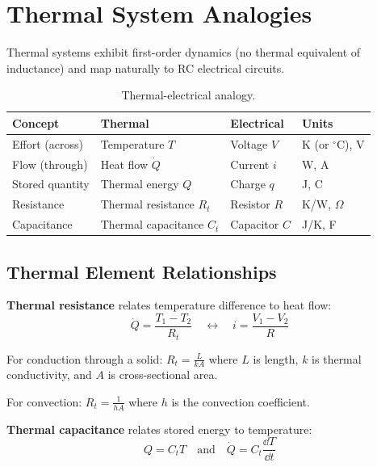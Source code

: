\section{Thermal System Analogies}
\label{sec:thermal}

Thermal systems exhibit first-order dynamics (no thermal equivalent of inductance) and map naturally to RC electrical circuits.

\begin{table}[htbp]
\centering
\begin{tabular}{llll}
\toprule
\textbf{Concept} & \textbf{Thermal} & \textbf{Electrical} & \textbf{Units} \\
\midrule
Effort (across) & Temperature $T$ & Voltage $V$ & K (or $^\circ$C), V \\
Flow (through) & Heat flow $\dot{Q}$ & Current $i$ & W, A \\
Stored quantity & Thermal energy $Q$ & Charge $q$ & J, C \\
\midrule
Resistance & Thermal resistance $R_t$ & Resistor $R$ & K/W, $\Omega$ \\
Capacitance & Thermal capacitance $C_t$ & Capacitor $C$ & J/K, F \\
\bottomrule
\end{tabular}
\caption{Thermal-electrical analogy.}
\label{tab:thermal}
\end{table}

\subsection{Thermal Element Relationships}

\textbf{Thermal resistance} relates temperature difference to heat flow:
\begin{equation}
\dot{Q} = \frac{T_1 - T_2}{R_t} \quad \longleftrightarrow \quad i = \frac{V_1 - V_2}{R}
\end{equation}

For conduction through a solid: $R_t = \frac{L}{kA}$ where $L$ is length, $k$ is thermal conductivity, and $A$ is cross-sectional area.

For convection: $R_t = \frac{1}{hA}$ where $h$ is the convection coefficient.

\textbf{Thermal capacitance} relates stored energy to temperature:
\begin{equation}
Q = C_t T \quad \text{and} \quad \dot{Q} = C_t \frac{\dd T}{\dd t}
\end{equation}

